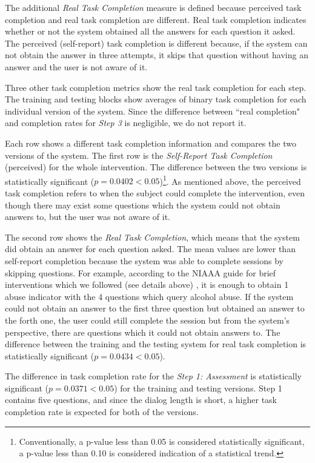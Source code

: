 \begin{sloppy}
The additional {\em Real Task Completion} measure is defined because perceived task completion and real task completion are different. Real task completion indicates whether or not the system obtained all the answers for each question it asked. The perceived (self-report) task completion is different because, if the system can not obtain the answer in three attempts, it skips that question without having an answer and the user is not aware of it.

Three other task completion metrics show the real task completion for each step. The training and testing blocks show averages of binary task completion for {each individual version} of the system. 
Since the difference between ``real completion" and completion rates for \textit{Step 3} is negligible, we do not report it.

Each row shows a different task completion information and compares the two versions of the system. The first row is the {\em Self-Report  Task Completion} (perceived) for the whole intervention. The difference between the two versions is statistically significant ($p=0.0402<0.05$)\footnote{Conventionally, a p-value less than 0.05 is considered statistically significant, a p-value less than 0.10 is considered indication of a statistical trend.}. As mentioned above, 
the perceived task completion refers to when the subject could complete the intervention, even though there may exist some questions which the system could not obtain answers to, but the user was not aware of it. 

The second row shows the {\em Real Task Completion}, which means that the system did obtain an answer for each question asked. The mean values are lower than self-report completion because the system was able to complete sessions by skipping questions. For example, according to the NIAAA guide for brief interventions which we followed (see details above) \cite{national2006niaaa}, it is enough to obtain 1 abuse indicator with the  4 questions which query alcohol abuse. If the system could not obtain an answer to  the first three question but obtained an answer to the forth one, the user could  still complete the session but from the system's perspective, there are questions which it could not obtain answers to. The difference between the training and the testing system for real task completion is statistically significant ($p=0.0434<0.05$).
 
The difference in task completion rate for the {\em Step 1: Assessment} is statistically significant ($p=0.0371<0.05$) for the training and testing versions.  Step 1  contains five questions, and since the dialog length is short, a higher task completion rate is expected for both of the versions. 


\end{sloppy}
